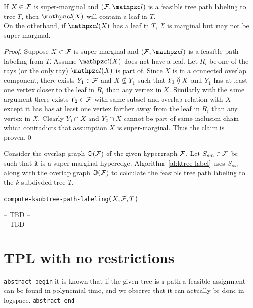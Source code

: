 \documentclass[MS]             %
              {iitmdiss_as}    %
\begin{document}
\begin{lemma}
  \label{lem:sup-mar}
  If $X \in {\cal F}$ is super-marginal and $(\cF, \cl)$ is a feasible
  tree path labeling to tree $T$, then $\cl(X)$ will
  contain a leaf in $T$.\\
  On the otherhand, if $\cl(X)$ has a leaf in
  $T$, $X$ is marginal but may not be super-marginal.
\end{lemma}
\begin{proof}
  Suppose $X \in {\cal F}$ is super-marginal and $(\cF, \cl)$ is a feasible
  path labeling from $T$.  Assume $\cl(X)$ does not have a leaf.  Let
  $R_i$ be one of the rays (or the only ray) $\cl(X)$ is part of.
  Since $X$ is in a connected overlap component, there exists $Y_1 \in
  {\cal F}$ and $X \nsubseteq Y_1$ such that $Y_1 \between X$ and $Y_1$ has
  at least one vertex closer to the leaf in $R_i$ than any vertex in
  $X$. Similarly with the same argument there exists $Y_2 \in {\cal F}$
  with same subset and overlap relation with $X$ except it has has at
  least one vertex farther away from the leaf in $R_i$ than any vertex
  in $X$. Clearly $Y_1 \cap X$ and $Y_2 \cap X$ cannot be part of same
  inclusion chain which contradicts that assumption $X$ is
  super-marginal. Thus the claim is proven.\qed
\end{proof}

\noindent
Consider the overlap graph $\mathbb O({\cal F})$ of the given hypergraph
${\cal F}$. Let $S_{sm} \in {\cal F}$ be such that it is a super-marginal
hyperedge.  Algorithm~\ref{al:ktree-label} uses $S_{sm}$ along with
the overlap graph $\mathbb O({\cal F})$ to calculate the feasible tree path
labeling to the $k$-subdivded tree $T$.

\begin{algorithm}[h]
  \caption{{\tt compute-ksubtree-path-labeling($X, {\cal F}, T$)}}
  \label{al:ktree-label}
  \begin{algorithmic}[\lndisplay]
    \STATE -- TBD --\\
    \ELSE 
    \STATE -- TBD --\\
    \ENDIF

 \end{algorithmic}
\end{algorithm}


\section{ TPL with no restrictions}
\label{sec:norestraint}

{\tt abstract begin}
  it is
  known that if the given tree is a path a feasible assignment can be
  found in polynomial time, and we observe that it can actually be
  done in logspace. \tnote{[TRUE?]}
{\tt abstract end}
\end{document}
